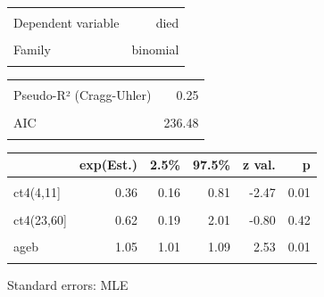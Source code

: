 \documentclass[
  12pt,
  letterpaper,
  DIV=11,
  numbers=noendperiod,
  onepage,
  openany]{scrreprt}
\begin{document}
\begin{table}[!h]
\centering
\begin{tabular}{lr}
\toprule
\cellcolor{gray!6}{Observations} & \cellcolor{gray!6}{197}\\
Dependent variable & died\\
\cellcolor{gray!6}{Type} & \cellcolor{gray!6}{Generalized linear model}\\
Family & binomial\\
\cellcolor{gray!6}{Link} & \cellcolor{gray!6}{logit}\\
\bottomrule
\end{tabular}
\end{table} \begin{table}[!h]
\centering
\begin{tabular}{lr}
\toprule
\cellcolor{gray!6}{$\chi^2$(6)} & \cellcolor{gray!6}{39.30}\\
Pseudo-R² (Cragg-Uhler) & 0.25\\
\cellcolor{gray!6}{Pseudo-R² (McFadden)} & \cellcolor{gray!6}{0.15}\\
AIC & 236.48\\
\cellcolor{gray!6}{BIC} & \cellcolor{gray!6}{259.46}\\
\bottomrule
\end{tabular}
\end{table} \begin{table}[!h]
\centering
\begin{threeparttable}
\begin{tabular}{lrrrrr}
\toprule
  & exp(Est.) & 2.5\% & 97.5\% & z val. & p\\
\midrule
\cellcolor{gray!6}{(Intercept)} & \cellcolor{gray!6}{1.17} & \cellcolor{gray!6}{0.77} & \cellcolor{gray!6}{1.79} & \cellcolor{gray!6}{0.73} & \cellcolor{gray!6}{0.47}\\
ct4(4,11] & 0.36 & 0.16 & 0.81 & -2.47 & 0.01\\
\cellcolor{gray!6}{ct4(11,23]} & \cellcolor{gray!6}{0.20} & \cellcolor{gray!6}{0.07} & \cellcolor{gray!6}{0.58} & \cellcolor{gray!6}{-2.96} & \cellcolor{gray!6}{0.00}\\
ct4(23,60] & 0.62 & 0.19 & 2.01 & -0.80 & 0.42\\
\cellcolor{gray!6}{yearb} & \cellcolor{gray!6}{0.82} & \cellcolor{gray!6}{0.68} & \cellcolor{gray!6}{0.98} & \cellcolor{gray!6}{-2.18} & \cellcolor{gray!6}{0.03}\\
\addlinespace
ageb & 1.05 & 1.01 & 1.09 & 2.53 & 0.01\\
\cellcolor{gray!6}{surgery} & \cellcolor{gray!6}{0.33} & \cellcolor{gray!6}{0.12} & \cellcolor{gray!6}{0.88} & \cellcolor{gray!6}{-2.21} & \cellcolor{gray!6}{0.03}\\
\bottomrule
\end{tabular}
\begin{tablenotes}
\item Standard errors: MLE
\end{tablenotes}
\end{threeparttable}
\end{table}
\end{document}
